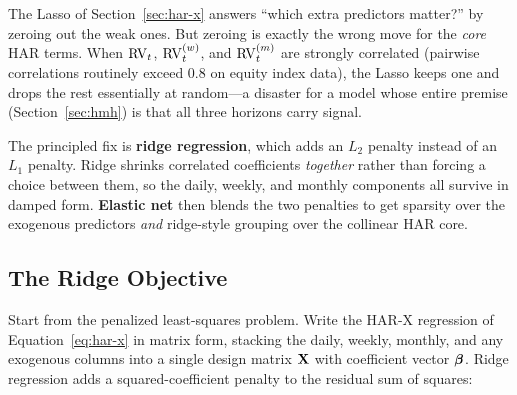The Lasso of Section~\ref{sec:har-x} answers ``which extra predictors matter?'' by zeroing out the weak ones.
But zeroing is exactly the wrong move for the \emph{core} HAR terms.
When $\operatorname{RV}_t$, $\operatorname{RV}^{(w)}_t$, and $\operatorname{RV}^{(m)}_t$ are strongly correlated (pairwise correlations routinely exceed $0.8$ on equity index data), the Lasso keeps one and drops the rest essentially at random---a disaster for a model whose entire premise (Section~\ref{sec:hmh}) is that all three horizons carry signal.

The principled fix is \textbf{ridge regression}, which adds an $L_2$ penalty instead of an $L_1$ penalty.
Ridge shrinks correlated coefficients \emph{together} rather than forcing a choice between them, so the daily, weekly, and monthly components all survive in damped form.
\textbf{Elastic net} then blends the two penalties to get sparsity over the exogenous predictors \emph{and} ridge-style grouping over the collinear HAR core.

\subsection{The Ridge Objective}

Start from the penalized least-squares problem.
Write the HAR-X regression of Equation~\eqref{eq:har-x} in matrix form, stacking the daily, weekly, monthly, and any exogenous columns into a single design matrix $\mathbf{X}$ with coefficient vector $\bm{\beta}$.
Ridge regression \citep{HoerlKennard1970} adds a squared-coefficient penalty to the residual sum of squares:

